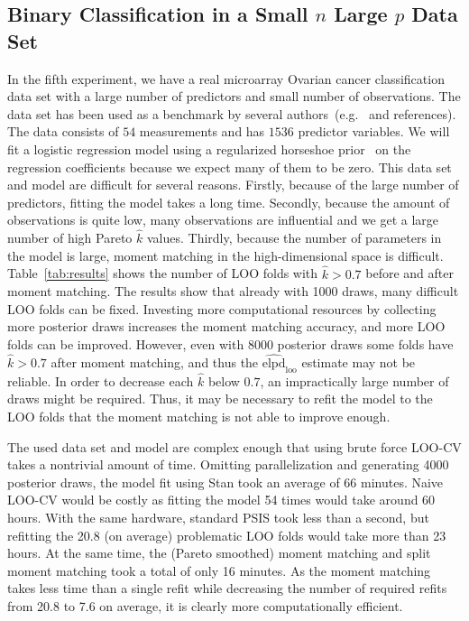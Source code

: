 \documentclass[12pt]{article}
\begin{document}
\subsection{Binary Classification in a Small $n$ Large $p$ Data Set} \label{sec:ovarian}

In the fifth experiment, we have a real microarray Ovarian cancer classification data set with a large number of
predictors and small number of observations.
The data set has been used as a benchmark by several authors~(e.g.~\citet{schummer1999comparative,hernandez2010expectation} and references).
The data consists of $54$ measurements and has $1536$ predictor variables.
We will fit a logistic regression model
using a regularized horseshoe prior~\citep{piironen2017rhs} on the regression coefficients because
we expect many of them to be zero.
This data set and model are difficult for several reasons.
Firstly, because of the large number of predictors,
fitting the model takes a long time. Secondly, because
the amount of observations is quite low, many observations are influential
and we get a large number of high Pareto $\hat{k}$
values. Thirdly, because the number of parameters in the model is large,
moment matching in the high-dimensional space is difficult.
Table~\ref{tab:results} shows the number of LOO folds with $\hat{k} > 0.7$
before and after moment matching.
The results show that already with 1000 draws,
many difficult LOO folds can be fixed. Investing more computational resources
by collecting more posterior draws increases
the moment matching accuracy, and more LOO folds can be improved.
However, even with $8000$ posterior draws some folds have $\hat{k} > 0.7$
after moment matching, and thus the $\widehat{\text{elpd}}_{\text{loo}}$
estimate may not be reliable.
In order to decrease each $\hat{k}$ below $0.7$, an impractically large number of
draws might be required.
Thus, it may be necessary to refit the model to the LOO folds
that the moment matching is not able to improve enough.



The used data set and model are complex enough that using brute force LOO-CV takes
a nontrivial amount of time. Omitting parallelization and generating
4000 posterior draws, the model
fit using Stan took an average of 66 minutes. Naive LOO-CV would be costly as fitting the model 54 times would take around 60 hours. 
With the same hardware, standard PSIS took less than a second, but refitting the 20.8 (on average)
problematic LOO folds would take more than 23 hours. At the same time, the (Pareto smoothed) moment matching and split moment matching took a total of only 16 minutes. As the moment matching takes less time than a single refit
while decreasing the number of required refits from 20.8 to 7.6 on average, it
is clearly more computationally efficient.
\end{document}
